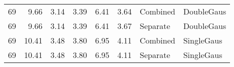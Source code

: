 \begin{tabular}{lrrrrrll}
 69   &                        9.66 &               3.14 &                         3.39 &              6.41 &               3.64 & Combined & DoubleGaus \\
 69   &                        9.66 &               3.14 &                         3.39 &              6.41 &               3.67 & Separate & DoubleGaus \\
 69   &                       10.41 &               3.48 &                         3.80 &              6.95 &               4.11 & Combined & SingleGaus \\
 69   &                       10.41 &               3.48 &                         3.80 &              6.95 &               4.11 & Separate & SingleGaus \\
\hline
\end{tabular}